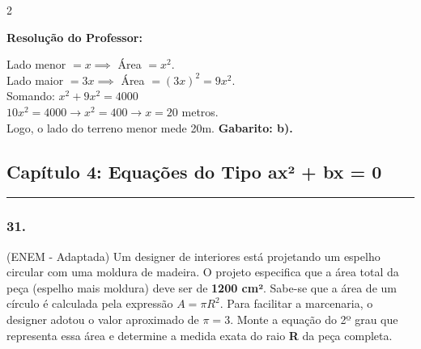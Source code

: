 \begin{multicols*}{2}
\ifgabarito
    \begin{tcolorbox}[colback=CorTitUm!5, colframe=CorTitUm, boxrule=1pt, arc=4pt, left=6pt, right=6pt, top=6pt, bottom=6pt]
    \small\textbf{\textcolor{CorTitUm}{Resolução do Professor:}}\par\vspace{0.1cm}
    \color{CinzaEscuro}
    Lado menor $= x \implies$ Área $= x^2$.\\
    Lado maior $= 3x \implies$ Área $= (3x)^2 = 9x^2$.\\
    Somando: $x^2 + 9x^2 = 4000$\\
    $10x^2 = 4000 \rightarrow x^2 = 400 \rightarrow x = 20$ metros.\\
    Logo, o lado do terreno menor mede 20m. \textbf{Gabarito: b).}
    \end{tcolorbox}
\fi

\par\vspace{\espacoQuestao}
\subsection*{Capítulo 4: Equações do Tipo ax² + bx = 0}
\vspace{-0.2cm}\noindent\rule{\linewidth}{1.5pt} 
\par\vspace{\espacoPosTitulo}
\subsubsection*{31.} (ENEM - Adaptada) Um designer de interiores está projetando um espelho circular com uma moldura de madeira. O projeto especifica que a área total da peça (espelho mais moldura) deve ser de \textbf{1200 cm²}. Sabe-se que a área de um círculo é calculada pela expressão $ A = \pi R^2 $. Para facilitar a marcenaria, o designer adotou o valor aproximado de $ \pi = 3 $. Monte a equação do 2º grau que representa essa área e determine a medida exata do raio \textbf{R} da peça completa.


\end{multicols*}
